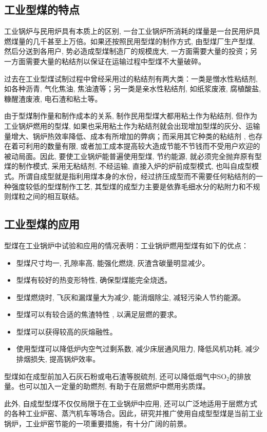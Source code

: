 \documentclass[10pt,openany]{ctexbook}
\begin{document}
\subsection{工业型煤的特点}
工业锅炉与民用炉具有本质上的区别, 一台工业锅炉所消耗的煤量是一台民用炉具燃煤量的几千甚至上万倍。如果还按照民用型煤的制作方式, 由型煤厂生产型煤, 然后分送到各用户, 势必造成型煤制造厂的规模庞大, 一方面需要大量的投资；另一方面需要大量的粘结剂以保证在运输过程中型煤不大量破碎。\par
    过去在工业型煤试制过程中曾经采用过的粘结剂有两大类：一类是憎水性粘结剂, 如各种沥青, 气化焦油, 焦油渣等；另一类是亲水性粘结剂, 如纸浆废液, 腐植酸盐, 糠醒渣废液, 电石渣和粘土等。\par
由于型煤制作量和制作成本的关系, 制作民用型煤大都用粘土作为粘结剂, 但作为工业锅炉燃用的型煤, 如果也采用粘土作为粘结剂就会出现增加型煤的灰分、运输量增大、锅炉热效率降低、成本有所增加的弊病；而采用其它种类的粘结剂 , 也存在着可利用的数量有限, 或者加工成本提高较大造成节能不节钱而不受用户欢迎的被动局面。因此, 要使工业锅炉能普遍使用型煤, 节约能源, 就必须完全抛弃原有型煤的制作模式, 采用无粘结剂, 不经运输, 直接入炉的炉前成型模式, 也叫自成型模式。所谓自成型就是指利用煤本身的水份，经过挤压成型而不需要任何粘结剂的一种强度较低的型煤制作工艺, 其型煤的成型力主要是依靠毛细水分的粘附力和不规则煤粒之间的相互联结。
\subsection{工业型煤的应用}
型煤在工业锅炉中试验和应用的情况表明：工业锅炉燃用型煤有如下的优点：
\begin{itemize}
\item 型煤尺寸均一, 孔隙率高, 能强化燃烧, 灰渣含碳量明显减少。
\item 型煤有较好的热变形特性, 确保型煤能完全烧透。
\item  型煤燃烧时, 飞灰和漏煤量大为减少, 能消烟除尘, 减轻污染人节约能源。
\item 型煤可以有较合适的焦渣特性 , 以满足层燃的要求。
\item 型煤可以获得较高的灰熔融性。
\item 使用型煤可以降低炉内空气过剩系数, 减少床层通风阻力, 降低风机功耗, 减少排烟损失, 提高锅炉效率。



 \end{itemize}
型煤如在成型前加入石灰石粉或电石渣等脱硫剂, 还可以降低烟气中SO$_2$的排放量。也可以加入一定量的助燃剂, 有助于在层燃炉中燃用劣质煤。\par
    此外, 自成型型煤不仅仅局限于在工业锅炉中应用, 还可以广泛地适用于层燃方式的各种工业炉窑、蒸汽机车等场合。因此，研究并推广使用自成型型煤是当前工业锅炉，工业炉窑节能的一项重要措施，有十分广阔的前景。
\end{document}
